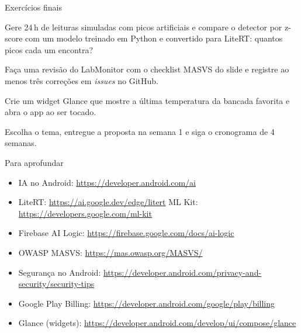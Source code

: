 \documentclass[aspectratio=169,10pt]{beamer}
\begin{document}
\begin{frame}{Exercícios finais}
  \begin{exercicio}[Exercício 1 --- IA]
    Gere 24\,h de leituras simuladas com picos artificiais e compare o detector por z-score com um modelo treinado em Python e convertido para LiteRT: quantos picos cada um encontra?
  \end{exercicio}
  \begin{exercicio}
    Faça uma revisão do LabMonitor com o checklist MASVS do slide e registre ao menos três correções em \emph{issues} no GitHub.
  \end{exercicio}
  \begin{exercicio}
    Crie um widget Glance que mostre a última temperatura da bancada favorita e abra o app ao ser tocado.
  \end{exercicio}
  \begin{projeto}
    Escolha o tema, entregue a proposta na semana 1 e siga o cronograma de 4 semanas.
  \end{projeto}
\end{frame}

\begin{frame}{Para aprofundar}
  \small
  \begin{itemize}
    \item IA no Android: \url{https://developer.android.com/ai}
    \item LiteRT: \url{https://ai.google.dev/edge/litert} \quad ML Kit: \url{https://developers.google.com/ml-kit}
    \item Firebase AI Logic: \url{https://firebase.google.com/docs/ai-logic}
    \item OWASP MASVS: \url{https://mas.owasp.org/MASVS/}
    \item Segurança no Android: \url{https://developer.android.com/privacy-and-security/security-tips}
    \item Google Play Billing: \url{https://developer.android.com/google/play/billing}
    \item Glance (widgets): \url{https://developer.android.com/develop/ui/compose/glance}
  \end{itemize}
\end{frame}

\begin{frame}
\end{frame}
\end{document}

